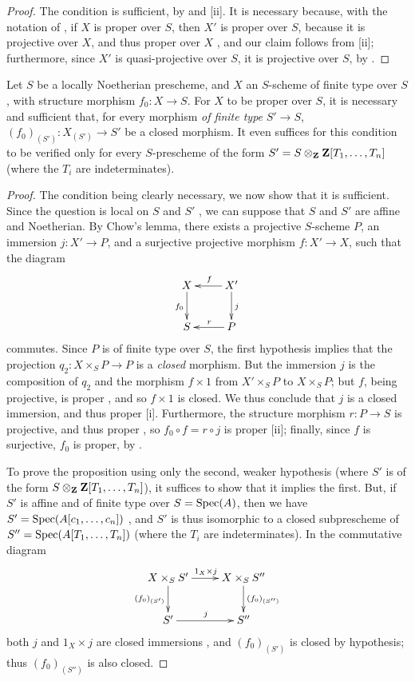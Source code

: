 \begin{proof}
\label{proof-2.5.6.2}
The condition is sufficient, by  and [ii].
It is necessary because, with the notation of , if $X$ is proper over $S$, then $X'$ is proper over $S$, because it is projective over $X$, and thus proper over $X$ , and our claim follows from [ii];
furthermore, since $X'$ is quasi-projective over $S$, it is projective over $S$, by .
\end{proof}

\begin{cor}[5.6.3]
\label{2.5.6.3}
Let $S$ be a locally Noetherian prescheme, and $X$ an $S$-scheme of finite type over $S$, with structure morphism $f_0:X\to S$.
For $X$ to be proper over $S$, it is necessary and sufficient that, for every morphism \emph{of finite type} $S'\to S$, $(f_0)_{(S')}:X_{(S')}\to S'$ be a closed morphism.
It even suffices for this condition to be verified only for every $S$-prescheme of the form $S'=S\otimes_\mathbf{Z}\mathbf{Z}[T_1,\ldots,T_n]$ (where the $T_i$ are indeterminates).
\end{cor}

\begin{proof}
\label{proof-2.5.6.3}
The condition being clearly necessary, we now show that it is sufficient.
Since the question is local on $S$ and $S'$ , we can suppose that $S$ and $S'$ are affine and Noetherian.
By Chow's lemma, there exists a projective $S$-scheme $P$, an immersion $j:X'\to P$, and a surjective projective morphism $f:X'\to X$, such that the diagram
\[
  \xymatrix{
    X\ar[d]_{f_0} &
    X'\ar[l]_f\ar[d]^j\\
    S &
    P\ar[l]_r
  }
\]
commutes.
Since $P$ is of finite type over $S$, the first hypothesis implies that the projection $q_2:X\times_S P\to P$ is a \emph{closed} morphism.
But the immersion $j$ is the composition of $q_2$ and the morphism $f\times1$ from $X'\times_S P$ to $X\times_S P$;
but $f$, being projective, is proper , and so $f\times1$ is closed.
We thus conclude that $j$ is a closed immersion, and thus proper [i].
Furthermore, the structure morphism $r:P\to S$ is projective, and thus proper , so $f_0\circ f=r\circ j$ is proper [ii];
finally, since $f$ is surjective, $f_0$ is proper, by .

To prove the proposition using only the second, weaker hypothesis (where $S'$ is of the form $S\otimes_\mathbf{Z}\mathbf{Z}[T_1,\ldots,T_n]$), it suffices to show that it implies the first.
But, if $S'$ is affine and of finite type over $S={\mathop{\mathrm{Spec}}\nolimits}(A)$,
then we have $S'={\mathop{\mathrm{Spec}}\nolimits}(A[c_1,\ldots,c_n])$ , and $S'$ is thus isomorphic to a closed subprescheme of $S''={\mathop{\mathrm{Spec}}\nolimits}(A[T_1,\ldots,T_n])$ (where the $T_i$ are indeterminates).
In the commutative diagram
\[
  \xymatrix{
    X\times_S S'\ar[r]^{1_X\times j}\ar[d]_{(f_0)_{(S')}} &
    X\times_S S''\ar[d]^{(f_0)_{(S'')}}\\
    S'\ar[r]^j &
    S''
  }
\]
both $j$ and $1_X\times j$ are closed immersions , and $(f_0)_{(S')}$ is closed by hypothesis; thus $(f_0)_{(S'')}$ is also closed.
\end{proof}
